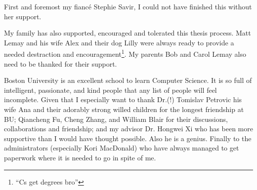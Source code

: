 First and foremost my fiancé Stephie Savir, I could not have finished this without her support. %
 
My family has also supported, encouraged and tolerated this thesis process.
Matt Lemay and his wife Alex and their dog Lilly were always ready to provide a needed destraction and encouragement\footnote{``Cs get degrees bro''}.
My parents Bob and Carol Lemay also need to be thanked for their support.
 
Boston University is an excellent school to learn Computer Science.
It is so full of intelligent, passionate, and kind people that any list of people will feel incomplete.
Given that I especially want to thank Dr.(!) Tomislav Petrovic his wife Ana and their adorably strong willed children for the longest friendship at BU;
Qiancheng Fu, Cheng Zhang, and William Blair for their discussions, collaborations and friendship;
and my advisor Dr. Hongwei Xi who has been more supportive than I would have thought possible.
Also he is a genius.
Finally to the administrators (especially Kori MacDonald) who have always managed to get paperwork where it is needed to go in spite of me.


